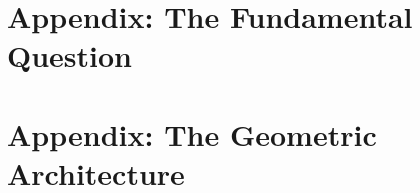 \documentclass[11pt,openright,twoside]{book}
\begin{document}







\appendix

\part{Appendix: The Fundamental Question}


\part{Appendix: The Geometric Architecture}




\end{document}
